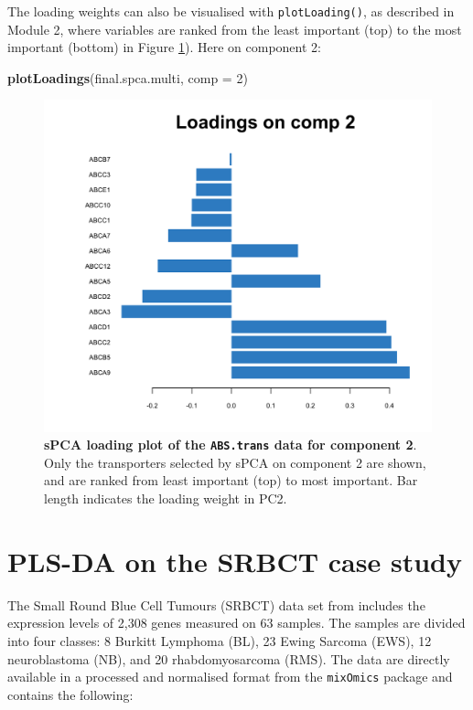 \documentclass[]{book}
\newenvironment{Shaded}{\begin{snugshade}}{\end{snugshade}}
\newcommand{\KeywordTok}[1]{\textcolor[rgb]{0.13,0.29,0.53}{\textbf{#1}}}
\newcommand{\DataTypeTok}[1]{\textcolor[rgb]{0.13,0.29,0.53}{#1}}
\newcommand{\DecValTok}[1]{\textcolor[rgb]{0.00,0.00,0.81}{#1}}
\newcommand{\NormalTok}[1]{#1}
\begin{document}
The loading weights can also be visualised with \texttt{plotLoading()},
as described in Module 2, where variables are ranked from the least
important (top) to the most important (bottom) in Figure
\ref{fig:spca-plotLoading}). Here on component 2:

\begin{Shaded}
\begin{Highlighting}[]
\KeywordTok{plotLoadings}\NormalTok{(final.spca.multi, }\DataTypeTok{comp =} \DecValTok{2}\NormalTok{)}
\end{Highlighting}
\end{Shaded}

\begin{figure}

{\centering \includegraphics[width=0.5\linewidth]{Figures/PCA/spca-plotLoading-1} 

}

\caption{\textbf{sPCA loading plot of the
\texttt{ABS.trans} data for component 2}. Only the transporters selected
by sPCA on component 2 are shown, and are ranked from least important
(top) to most important. Bar length indicates the loading weight in PC2.}\label{fig:spca-plotLoading}
\end{figure}






\chapter{PLS-DA on the SRBCT case study}\label{plsda-srbct-case}

The Small Round Blue Cell Tumours (SRBCT) data set from \citep{Kha01}
includes the expression levels of 2,308 genes measured on 63 samples.
The samples are divided into four classes: 8 Burkitt Lymphoma (BL), 23
Ewing Sarcoma (EWS), 12 neuroblastoma (NB), and 20 rhabdomyosarcoma
(RMS). The data are directly available in a processed and normalised
format from the \texttt{mixOmics} package and contains the following:
\end{document}
